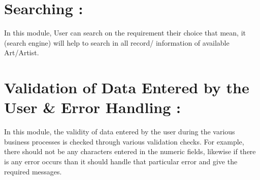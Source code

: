 \documentclass{article}
\begin{document}
\section*{Searching : }In this module, User can search on the requirement their choice that mean, it (search engine) will help to search in all record/ information of available Art/Artist.
\section*{ Validation of Data Entered by the User & Error Handling : }In this module, the validity of data entered by the user during the various business processes is checked through various validation checks. For example, there should not be any characters entered in the numeric fields, likewise if there is any error occurs than it should handle that particular error and give the required messages.
\end{document}
